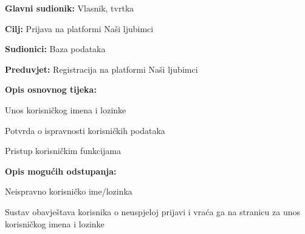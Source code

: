 				\noindent {}
				\begin{packed_item}
					
					\item \textbf{Glavni sudionik: } Vlasnik, tvrtka
					\item  \textbf{Cilj:} Prijava na platformi Naši ljubimci
					\item  \textbf{Sudionici:} Baza podataka
					\item  \textbf{Preduvjet:} Registracija na platformi Naši ljubimci 
					\item  \textbf{Opis osnovnog tijeka:}
					
					\item[] \begin{packed_enum}
						
						\item Unos korisničkog imena i lozinke
						\item Potvrda o ispravnosti korisničkih podataka
						\item Pristup korisničkim funkcijama
						
					\end{packed_enum}
					
					\item  \textbf{Opis mogućih odstupanja:}
					
					\item[] \begin{packed_item}
						
						\item[2.a] Neispravno korisničko ime/lozinka
						\item[] \begin{packed_enum}
							
							\item Sustav obavještava korisnika o neuspjeloj prijavi i vraća ga na 		stranicu za unos korisničkog imena i lozinke	
							
						\end{packed_enum}	
					\end{packed_item}
				\end{packed_item}
				
